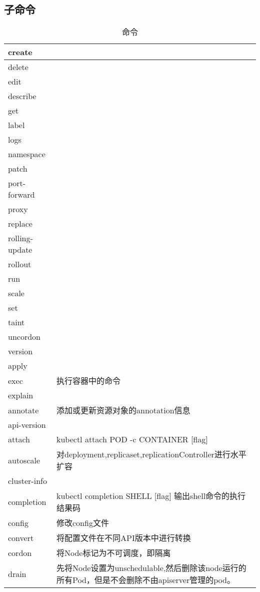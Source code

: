 \documentclass{ctexart}
\begin{document}
\subsection{子命令}
\begin{table}[H]
	\centering
	\caption{命令}
	\begin{tabular}{|l|p{}|}
		\hline
		 create & \\\hline
	delete & \\\hline
	edit & \\\hline
		describe& \\\hline
	get& \\\hline
	label & \\\hline
	logs & \\\hline
	namespace & \\\hline
	patch & \\\hline
	port-forward & \\\hline
	proxy & \\\hline
	replace & \\\hline
	rolling-update & \\\hline
	rollout & \\\hline
	run & \\\hline
	scale & \\\hline
	set & \\\hline
	taint & \\\hline
	uncordon & \\\hline
	version & \\\hline
	apply& \\\hline
	exec & 执行容器中的命令\\\hline
	explain & \\\hline
annotate & 添加或更新资源对象的annotation信息 \\\hline
api-version& \\\hline
attach & kubectl attach POD -c CONTAINER [flag]  \\\hline
autoscale & 对deployment,replicaset,replicationController进行水平扩容  \\\hline
cluster-info & \\\hline
completion & kubectl completion SHELL [flag] 输出shell命令的执行结果码 \\\hline
config & 修改config文件  \\\hline
convert & 将配置文件在不同API版本中进行转换\\\hline
cordon & 将Node标记为不可调度，即隔离 \\\hline
drain & 先将Node设置为unschedulable,然后删除该node运行的所有Pod，但是不会删除不由apiserver管理的pod。 \\\hline
%
	\end{tabular}
\end{table}
\end{document}
